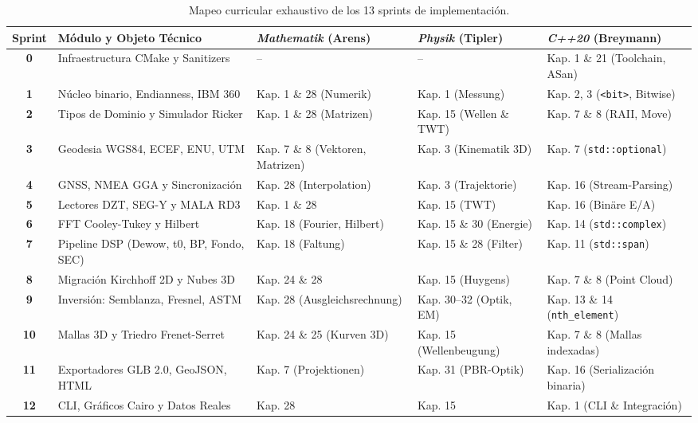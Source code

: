\documentclass[11pt,a4paper]{article}
\begin{document}
\begin{table}[htbp]
\centering
\footnotesize
\begin{tabular}{|c|p{4.0cm}|p{3.2cm}|p{2.9cm}|p{3.2cm}|}
\hline
\textbf{Sprint} & \textbf{Módulo y Objeto Técnico} & \textbf{\textit{Mathematik} (Arens)} & \textbf{\textit{Physik} (Tipler)} & \textbf{\textit{C++20} (Breymann)} \\
\hline
\textbf{0} & Infraestructura CMake y Sanitizers & -- & -- & Kap. 1 \& 21 (Toolchain, ASan) \\
\hline
\textbf{1} & Núcleo binario, Endianness, IBM 360 & Kap. 1 \& 28 (Numerik) & Kap. 1 (Messung) & Kap. 2, 3 (\texttt{<bit>}, Bitwise) \\
\hline
\textbf{2} & Tipos de Dominio y Simulador Ricker & Kap. 1 \& 28 (Matrizen) & Kap. 15 (Wellen \& TWT) & Kap. 7 \& 8 (RAII, Move) \\
\hline
\textbf{3} & Geodesia WGS84, ECEF, ENU, UTM & Kap. 7 \& 8 (Vektoren, Matrizen) & Kap. 3 (Kinematik 3D) & Kap. 7 (\texttt{std::optional}) \\
\hline
\textbf{4} & GNSS, NMEA GGA y Sincronización & Kap. 28 (Interpolation) & Kap. 3 (Trajektorie) & Kap. 16 (Stream-Parsing) \\
\hline
\textbf{5} & Lectores DZT, SEG-Y y MALA RD3 & Kap. 1 \& 28 & Kap. 15 (TWT) & Kap. 16 (Binäre E/A) \\
\hline
\textbf{6} & FFT Cooley-Tukey y Hilbert & Kap. 18 (Fourier, Hilbert) & Kap. 15 \& 30 (Energie) & Kap. 14 (\texttt{std::complex}) \\
\hline
\textbf{7} & Pipeline DSP (Dewow, t0, BP, Fondo, SEC) & Kap. 18 (Faltung) & Kap. 15 \& 28 (Filter) & Kap. 11 (\texttt{std::span}) \\
\hline
\textbf{8} & Migración Kirchhoff 2D y Nubes 3D & Kap. 24 \& 28 & Kap. 15 (Huygens) & Kap. 7 \& 8 (Point Cloud) \\
\hline
\textbf{9} & Inversión: Semblanza, Fresnel, ASTM & Kap. 28 (Ausgleichsrechnung) & Kap. 30--32 (Optik, EM) & Kap. 13 \& 14 (\texttt{nth\_element}) \\
\hline
\textbf{10} & Mallas 3D y Triedro Frenet-Serret & Kap. 24 \& 25 (Kurven 3D) & Kap. 15 (Wellenbeugung) & Kap. 7 \& 8 (Mallas indexadas) \\
\hline
\textbf{11} & Exportadores GLB 2.0, GeoJSON, HTML & Kap. 7 (Projektionen) & Kap. 31 (PBR-Optik) & Kap. 16 (Serialización binaria) \\
\hline
\textbf{12} & CLI, Gráficos Cairo y Datos Reales & Kap. 28 & Kap. 15 & Kap. 1 (CLI \& Integración) \\
\hline
\end{tabular}
\caption{Mapeo curricular exhaustivo de los 13 sprints de implementación.}
\end{table}
\end{document}
